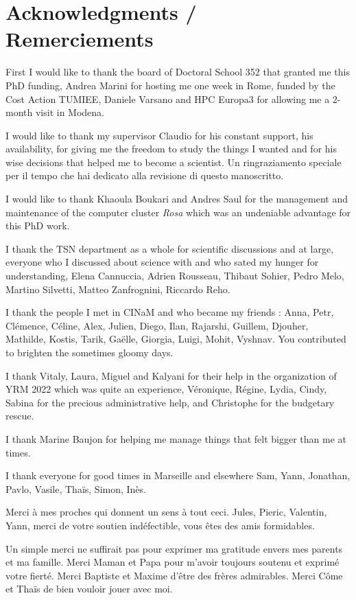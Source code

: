 \chapter*{Acknowledgments / Remerciements}

First I would like to thank the board of Doctoral School 352 that granted me this PhD funding, Andrea Marini for hosting me one week in Rome, funded by the Cost Action TUMIEE, Daniele Varsano and HPC Europa3 for allowing me a 2-month visit in Modena.

I would like to thank my supervisor Claudio for his constant support, his availability, for giving me the freedom to study the things I wanted and for his wise decisions that helped me to become a scientist. Un ringraziamento speciale per il tempo che hai dedicato alla revisione di questo manoscritto.


I would like to thank Khaoula Boukari and Andres Saul for the management and maintenance of the computer cluster \textit{Rosa} which was an undeniable advantage for this PhD work.

I thank the TSN department as a whole for scientific discussions and at large, everyone who I discussed about science with and who sated my hunger for understanding, Elena Cannuccia, Adrien Rousseau, Thibaut Sohier, Pedro Melo, Martino Silvetti, Matteo Zanfrognini, Riccardo Reho.

I thank the people I met in CINaM and who became my friends : Anna, Petr, Clémence, Céline, Alex, Julien, Diego, Ilan, Rajarshi, Guillem, Djouher, Mathilde, Kostis, Tarik, Gaëlle, Giorgia, Luigi,  Mohit, Vyshnav. You contributed to brighten the sometimes gloomy days. 

I thank Vitaly, Laura, Miguel and Kalyani for their help in the organization of YRM 2022 which was quite an experience, Véronique, Régine, Lydia, Cindy, Sabina for the precious administrative help, and Christophe for the budgetary rescue.

I thank Marine Baujon for helping me manage things that felt bigger than me at times.

I thank everyone for good times in Marseille and elsewhere Sam, Yann, Jonathan, Pavlo, Vasile, Thaïs, Simon, Inès.

Merci à mes proches qui donnent un sens à tout ceci. Jules, Pieric, Valentin, Yann, merci de votre soutien indéfectible, vous êtes des amis formidables.

Un simple merci ne suffirait pas pour exprimer ma gratitude envers mes parents et ma famille. Merci Maman et Papa pour m'avoir toujours soutenu et exprimé votre fierté. Merci Baptiste et Maxime d'être des frères admirables. Merci Côme et Thaïs de bien vouloir jouer avec moi.
